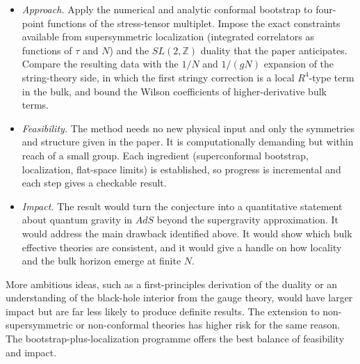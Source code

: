 \documentclass[11pt]{article}
\begin{document}
\begin{itemize}
\item \emph{Approach.} Apply the numerical and analytic conformal bootstrap to four-point functions of the stress-tensor multiplet. Impose the exact constraints available from supersymmetric localization (integrated correlators as functions of $\tau$ and $N$) and the $SL(2,\mathbb Z)$ duality that the paper anticipates. Compare the resulting data with the $1/N$ and $1/(gN)$ expansion of the string-theory side, in which the first stringy correction is a local $R^4$-type term in the bulk, and bound the Wilson coefficients of higher-derivative bulk terms.
\item \emph{Feasibility.} The method needs no new physical input and only the symmetries and structure given in the paper. It is computationally demanding but within reach of a small group. Each ingredient (superconformal bootstrap, localization, flat-space limits) is established, so progress is incremental and each step gives a checkable result.
\item \emph{Impact.} The result would turn the conjecture into a quantitative statement about quantum gravity in $AdS$ beyond the supergravity approximation. It would address the main drawback identified above. It would show which bulk effective theories are consistent, and it would give a handle on how locality and the bulk horizon emerge at finite $N$.
\end{itemize}

More ambitious ideas, such as a first-principles derivation of the duality or an understanding of the black-hole interior from the gauge theory, would have larger impact but are far less likely to produce definite results. The extension to non-supersymmetric or non-conformal theories has higher risk for the same reason. The bootstrap-plus-localization programme offers the best balance of feasibility and impact.
\end{document}
